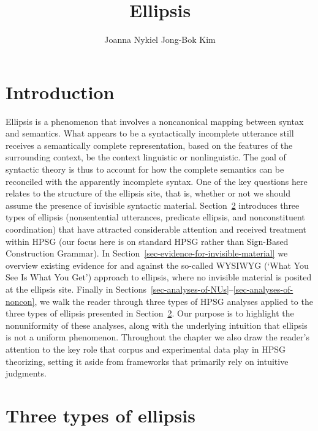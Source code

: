 \documentclass[output=paper
	        ,collection
	        ,collectionchapter
 	        ,biblatex
                ,babelshorthands
                ,newtxmath
                ,draftmode
                ,colorlinks, citecolor=brown
]{langscibook}
\author{%
	Joanna Nykiel\affiliation{Kyung Hee University, Seoul}%
	\lastand Jong-Bok Kim\affiliation{Kyung Hee University, Seoul}%
}
\title{Ellipsis}
\begin{document}
\maketitle
\label{chap-ellipsis}

{

\section{Introduction}
\label{ellipsis-sec-introduction}

Ellipsis is a phenomenon that involves a noncanonical mapping between syntax and semantics. What appears to be a syntactically incomplete utterance still receives a semantically complete representation, based on the features of the surrounding context, be the context linguistic or nonlinguistic. The goal of syntactic theory is thus to account for how the complete semantics can be reconciled with the apparently incomplete syntax. One of the key questions here relates to the structure of the ellipsis site, that is, whether or not we should assume the presence of invisible syntactic material. Section~\ref{sec-three-types-of-ellipsis} introduces three types of ellipsis (nonsentential utterances, predicate ellipsis, and nonconstituent coordination) that have attracted considerable attention and received treatment within HPSG (our focus here is on standard HPSG rather than Sign-Based Construction Grammar). In Section~\ref{sec-evidence-for-invisible-material} we overview existing evidence for and against the so-called WYSIWYG (`What You See Is What You Get') approach to ellipsis, where no invisible material is posited at the ellipsis site. Finally in Sections~\ref{sec-analyses-of-NUs}--\ref{sec-analyses-of-noncon}, we walk the reader through three types of HPSG analyses applied to the three types of ellipsis presented in Section~\ref{sec-three-types-of-ellipsis}. Our purpose is to highlight the nonuniformity of these analyses, along with the underlying intuition that ellipsis is not a uniform phenomenon. Throughout the chapter we also draw the reader's attention to the key role that corpus and experimental data play in HPSG theorizing, setting it aside from frameworks that primarily rely on intuitive judgments.




\section{Three types of ellipsis}
\label{sec-three-types-of-ellipsis}

}
\end{document}
